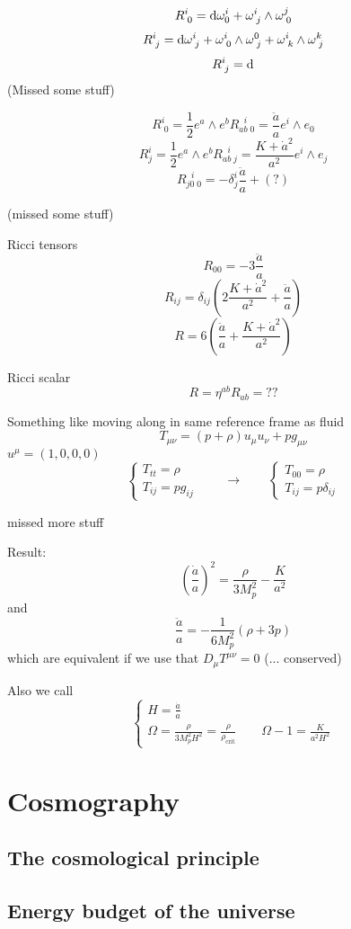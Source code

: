 \[ R^i_{\;0} = \operatorname{d \!}{\omega}^i_{0} + \omega^i_{\;j}\wedge \omega^j_{\;0} \]
\[ R^i_{\;j} = \operatorname{d \!}{\omega^i_{\;j}} + \omega^i_{\;0}\wedge\omega^0_{\;j} + \omega^i_{\;k}\wedge\omega^{k}_{\;j} \]
\[ R^i_{\;j} = \operatorname{d \!}{} \]
(Missed some stuff)

\[R^i_{\;0} = \frac{1}{2}e^a\wedge e^b R_{ab\;0}^{\;\;i} = \frac{\ddot{a}}{a}e^i\wedge e_0\]
\[ R^i_{j} = \frac{1}{2}e^a\wedge e^b R_{ab\;j}^{\;\;i} = \frac{K+\dot{a}^2}{a^2}e^i\wedge e_j \]
\[ R_{j0\;0}^{\;\;i} = - \delta^i_j \frac{\ddot{a}}{a} + (?)\]

(missed some stuff)

Ricci tensors
\[ R_00 = - 3 \frac{\ddot{a}}{a} \]
\[ R_{ij} = \delta_{ij} \left(2 \frac{K+\dot{a}^2}{a^2} + \frac{\ddot{a}}{a}\right) \]
\[ R = 6 \left(\frac{\ddot{a}}{a} + \frac{K+ \dot{a}^2}{a^2}\right) \]

Ricci scalar
\[ R = \eta^{ab}R_{ab} = ?? \]

Something like moving along in same reference frame as fluid
\[ T_{\mu\nu} = (p+\rho)u_\mu u_\nu + pg_{\mu\nu} \]
$u^\mu = (1,0,0,0)$
\[ \begin{cases}
T_{tt} = \rho \\ T_{ij} = pg_{ij}
\end{cases} \qquad \to \qquad \begin{cases}
T_00 = \rho \\ T_{ij} = p \delta_{ij}
\end{cases} \]

missed more stuff

Result:
\[ \left(\frac{\dot{a}}{a}\right)^2 = \frac{\rho}{3M_p^2} - \frac{K}{a^2} \]
and
\[\frac{\ddot{a}}{a} = - \frac{1}{6M_p^2}\left(\rho+3p\right)\]
which are equivalent if we use that $D_\mu T^{\mu\nu} = 0$ (... conserved)

Also we call
\[ \begin{cases}
H = \frac{\dot{a}}{a}  \\
\Omega = \frac{\rho}{3M_p^2H^2} = \frac{\rho}{\rho_\text{crit}} \qquad \Omega-1 = \frac{K}{a^2H^2}
\end{cases} \]


\chapter{Cosmography}
\section{The cosmological principle}
\section{Energy budget of the universe}
